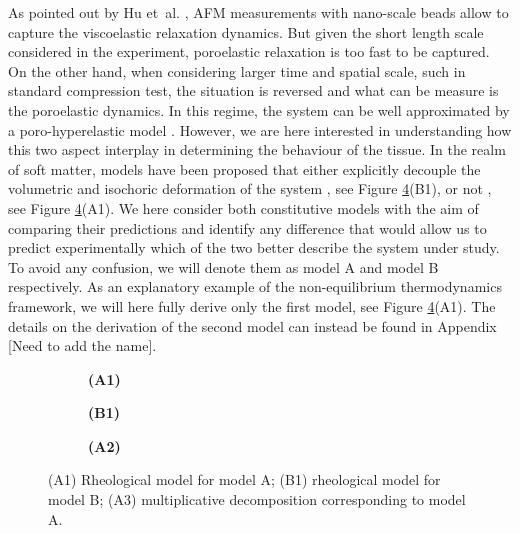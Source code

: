 \documentclass[runningheads]{llncs}
\begin{document}
As pointed out by Hu et~al. \cite{viscoporo}, AFM measurements with nano-scale beads allow to capture the viscoelastic relaxation dynamics. But given the short length scale considered in the experiment, poroelastic relaxation is too fast to be captured. On the other hand, when considering larger time and spatial scale, such in standard compression test, the situation is reversed and what can be measure is the poroelastic dynamics. In this regime, the system can be well approximated by a poro-hyperelastic model \cite{Reviewpolyel,ecm2}. However, we are here interested in understanding how this two aspect interplay in determining the behaviour of the tissue. In the realm of soft matter, models have been proposed that either explicitly decouple the volumetric and isochoric deformation of the system \cite{magneto,NGUYEN}, see Figure \ref{figmode}(B1), or not \cite{Article1,CACCAVO2}, see Figure \ref{figmode}(A1). We here consider both constitutive models with the aim of comparing their predictions and identify any difference that would allow us to predict experimentally which of the two better describe the system under study. To avoid any confusion, we will denote them as model A and model B respectively. As an explanatory example of the non-equilibrium thermodynamics framework, we will here fully derive only the first model, see Figure \ref{figmode}(A1). The details on the derivation of the second model can instead be found in Appendix [Need to add the name]. 

\begin{figure}[h!]
	\hspace{-12mm}
	\begin{subfigure}{0.32\textwidth}
		\centering
		\large
	\def\svgwidth{0.95\linewidth}
	
	\caption*{\textbf{(A1)}}
	\label{fig1A}
	\end{subfigure}
	\begin{subfigure}{0.32\textwidth}
	\large
	\def\svgwidth{0.92\linewidth}
	
	\caption*{\textbf{(B1)}}
	\label{fig1B}
\end{subfigure}
\begin{subfigure}{0.34\textwidth}
	\Large
	\def\svgwidth{1.75\linewidth}
	
	\caption*{\textbf{(A2)}}
	\label{Model2}
\end{subfigure}
\vspace{5mm}
\caption{(A1) Rheological model for model A; (B1) rheological model for model B; (A3) multiplicative decomposition corresponding to model A.}
\label{figmode}
\end{figure}
\end{document}
